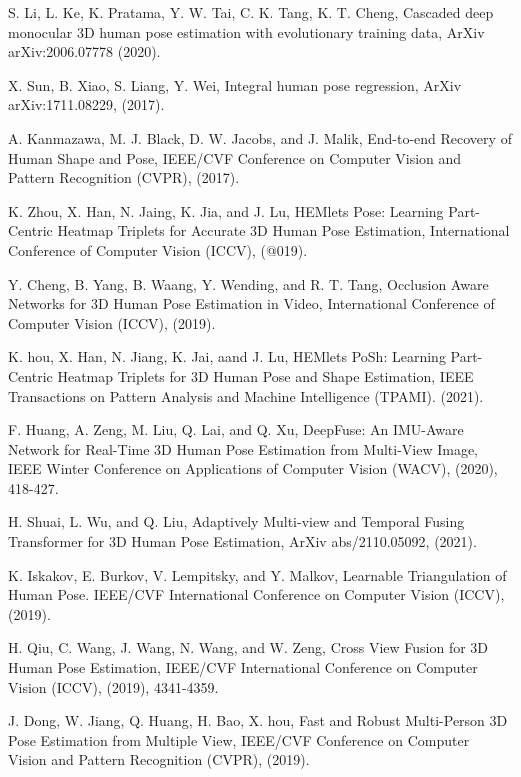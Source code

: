 \documentclass{article}
\begin{document}
\begin{thebibliography}{9}
 S. Li, L. Ke, K. Pratama, Y. W. Tai, C. K. Tang, K. T. Cheng, Cascaded deep monocular 3D human pose  estimation with evolutionary training data, ArXiv arXiv:2006.07778 (2020).

 X. Sun, B. Xiao, S. Liang, Y. Wei, Integral human pose regression, ArXiv arXiv:1711.08229, (2017).

 A. Kanmazawa, M. J. Black, D. W. Jacobs, and J. Malik, End-to-end Recovery of Human Shape and Pose, IEEE/CVF Conference on Computer Vision and Pattern Recognition (CVPR), (2017).

 K. Zhou, X. Han, N. Jaing, K. Jia, and J. Lu, HEMlets Pose: Learning Part-Centric Heatmap Triplets for Accurate 3D Human Pose Estimation, International Conference of Computer Vision (ICCV), (@019).

 Y. Cheng, B. Yang, B. Waang, Y. Wending, and R. T. Tang, Occlusion Aware Networks for 3D Human Pose Estimation in Video, International Conference of Computer Vision (ICCV), (2019).

 K. hou, X. Han, N. Jiang, K. Jai, aand J. Lu, HEMlets PoSh: Learning Part-Centric Heatmap Triplets for 3D Human Pose and Shape  Estimation, IEEE Transactions on Pattern Analysis and Machine Intelligence (TPAMI). (2021).

 F. Huang, A. Zeng, M. Liu, Q. Lai, and Q. Xu, DeepFuse: An IMU-Aware Network for Real-Time 3D Human Pose Estimation from Multi-View Image, IEEE Winter Conference on Applications of Computer Vision (WACV), (2020), 418-427.

 H. Shuai, L. Wu, and Q. Liu, Adaptively Multi-view and Temporal Fusing Transformer for 3D Human Pose Estimation, ArXiv abs/2110.05092, (2021).


 K. Iskakov, E. Burkov, V. Lempitsky, and Y. Malkov, Learnable Triangulation of Human Pose. IEEE/CVF International Conference on Computer Vision (ICCV), (2019).

 H. Qiu, C. Wang, J. Wang, N. Wang, and W. Zeng, Cross View Fusion for 3D Human Pose Estimation, IEEE/CVF International Conference on Computer Vision (ICCV), (2019), 4341-4359.

 J. Dong, W. Jiang, Q. Huang, H. Bao, X. hou, Fast and Robust Multi-Person 3D Pose Estimation from Multiple View, IEEE/CVF Conference on Computer Vision and Pattern Recognition (CVPR), (2019).


\end{thebibliography}
\end{document}
